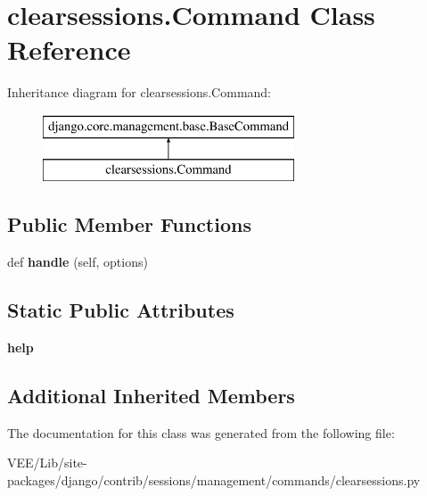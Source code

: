 \hypertarget{classclearsessions_1_1_command}{}\section{clearsessions.\+Command Class Reference}
\label{classclearsessions_1_1_command}
Inheritance diagram for clearsessions.\+Command\+:\begin{figure}[H]
\begin{center}
\leavevmode
\includegraphics[height=2.000000cm]{classclearsessions_1_1_command}
\end{center}
\end{figure}
\subsection*{Public Member Functions}
\begin{DoxyCompactItemize}
\item 
\mbox{\label{classclearsessions_1_1_command_ad3d771b74edaed3740e90fdae8f0c1b6}} 
def {\bfseries handle} (self, options)
\end{DoxyCompactItemize}
\subsection*{Static Public Attributes}
\begin{DoxyCompactItemize}
\item 
\mbox{\label{classclearsessions_1_1_command_a29a929eac86ef2871268cc1e3714ec9a}} 
{\bfseries help}
\end{DoxyCompactItemize}
\subsection*{Additional Inherited Members}


The documentation for this class was generated from the following file\+:\begin{DoxyCompactItemize}
\item 
V\+E\+E/\+Lib/site-\/packages/django/contrib/sessions/management/commands/clearsessions.\+py\end{DoxyCompactItemize}
